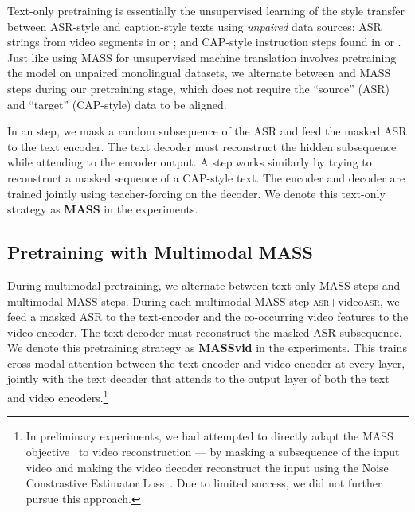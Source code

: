 \documentclass[11pt,a4paper]{article}
\begin{document}
\iffalse
\begin{figure*}
    \centering
    \texttt{[image: plots/mass\_archi\_big.pdf]}
    \caption{MASS Pretraining. 
    We mask a random subsequence of text (masked tokens represented with ``\_'') and feed it to the encoder. The decoder has to to reconstruct the masked input, but it can only access the visible parts of the input after learning encoder-decoder attention. Figure courtesy of~\citet{song2019mass}.}
    \label{fig:textmass}
\end{figure*}
\fi

Text-only pretraining is essentially the unsupervised learning of the style transfer between ASR-style and caption-style texts using {\em unpaired} data sources: ASR strings from video segments in \youtube or \howto; and CAP-style instruction steps
found in \recipes or \howto.
Just like using MASS for unsupervised machine translation involves pretraining the model on unpaired monolingual datasets,
we alternate between \ASRtoASR and \CAPtoCAP MASS steps during our pretraining stage,
which does not require the ``source'' (ASR) and ``target'' (CAP-style) data to be aligned.


In an \ASRtoASR step, we mask a random subsequence of the ASR and feed the masked ASR to the text encoder. The text decoder must reconstruct the hidden subsequence while attending to the encoder output. A \CAPtoCAP step works similarly by trying to reconstruct a masked sequence of a CAP-style text.  The encoder and decoder are trained jointly using teacher-forcing on the decoder. We denote this text-only strategy as \textbf{MASS} in the experiments.


\subsection{Pretraining with Multimodal MASS}

During multimodal pretraining, 
we alternate between text-only \CAPtoCAP MASS steps and multimodal MASS steps.
During each multimodal MASS step \textsc{asr}+video\textsc{asr}, we feed a masked ASR to the text-encoder and the co-occurring video features to the video-encoder.
The text decoder must reconstruct the masked ASR subsequence.
We denote this pretraining strategy as \textbf{MASSvid} in the experiments.
This trains cross-modal attention between the text-encoder and video-encoder at every layer, 
jointly with the text decoder that attends to the output layer of both the text and video encoders.\footnote{
In preliminary experiments, we had attempted to directly adapt the MASS objective~\citep{song2019mass} to video reconstruction --- by masking a subsequence of the input video and making the video decoder reconstruct the input using the Noise Constrastive Estimator Loss~\citep{sun2019contrastive}. 
Due to limited success, we did not further pursue this approach.
}
\end{document}
